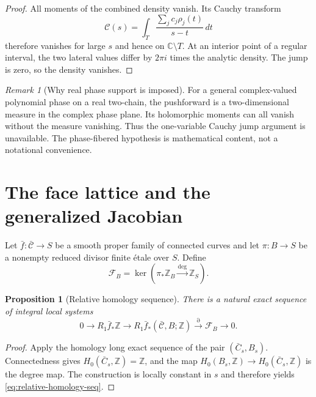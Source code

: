 \documentclass[11pt]{article}
\numberwithin{equation}{section}
\newtheorem{proposition}[proposition]{Proposition}
\theoremstyle{definition}
\theoremstyle{remark}
\newtheorem{remark}[remark]{Remark}
\newcommand{\C}{\mathbb C}
\newcommand{\Z}{\mathbb Z}
\newcommand{\Fcal}{\mathcal F}
\begin{document}
\begin{proof}
All moments of the combined density vanish.  Its Cauchy transform
\[
  \mathcal C(s)=\int_T\frac{\sum_j c_j\rho_j(t)}{s-t}\,dt
\]
therefore vanishes for large $s$ and hence on $\C\setminus T$.  At an interior
point of a regular interval, the two lateral values differ by $2\pi i$ times
the analytic density.  The jump is zero, so the density vanishes.
\end{proof}

\begin{remark}[Why real phase support is imposed]\label{rem:phase-support}
For a general complex-valued polynomial phase on a real two-chain, the
pushforward is a two-dimensional measure in the complex phase plane.  Its
holomorphic moments can all vanish without the measure vanishing.  Thus the
one-variable Cauchy jump argument is unavailable.  The phase-fibered
hypothesis is mathematical content, not a notational convenience.
\end{remark}

\section{The face lattice and the generalized Jacobian}\label{sec:face}

Let $\bar f:\bar{\mathcal C}\to S$ be a smooth proper family of connected
curves and let $\pi:B\to S$ be a nonempty reduced divisor finite \'etale over $S$.
Define
\begin{equation}\label{eq:face-lattice}
  \Fcal_B
  =\ker\left(\pi_*\Z_B\xrightarrow{\deg}\Z_S\right).
\end{equation}

\begin{proposition}[Relative homology sequence]\label{prop:relative-homology}
There is a natural exact sequence of integral local systems
\begin{equation}\label{eq:relative-homology-seq}
  0\longrightarrow R_1\bar f_*\Z
  \longrightarrow R_1\bar f_*(\bar{\mathcal C},B;\Z)
  \xrightarrow{\partial}\Fcal_B
  \longrightarrow0.
\end{equation}
\end{proposition}

\begin{proof}
Apply the homology long exact sequence of the pair $(\bar C_s,B_s)$.
Connectedness gives $H_0(\bar C_s,\Z)=\Z$, and the map
$H_0(B_s,\Z)\to H_0(\bar C_s,\Z)$ is the degree map.  The construction is
locally constant in $s$ and therefore yields \eqref{eq:relative-homology-seq}.
\end{proof}
\end{document}
